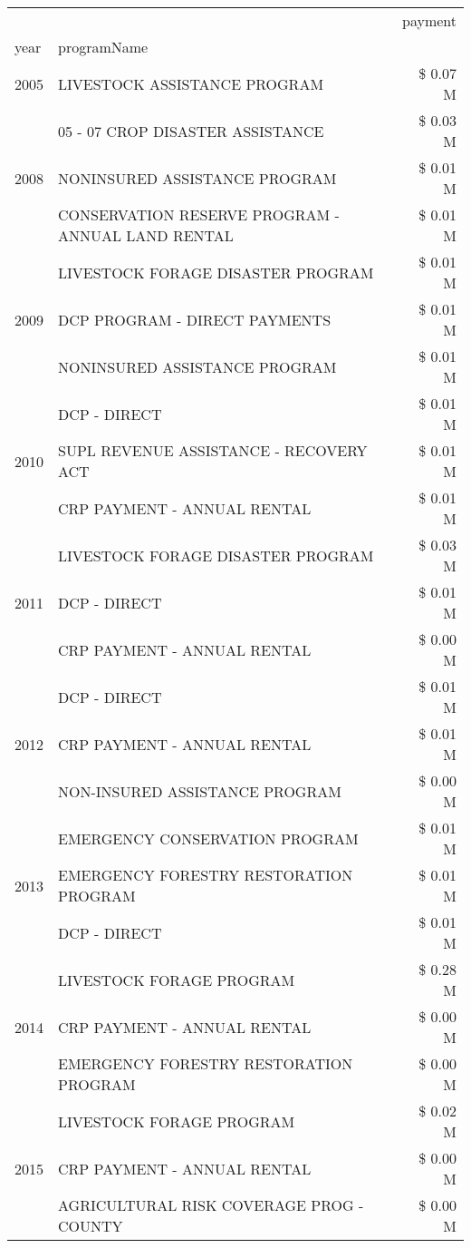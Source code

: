 \begin{tabular}{llr}
\toprule
 &  & payment \\
year & programName &  \\
\midrule
2005 & LIVESTOCK ASSISTANCE PROGRAM & \$ 0.07 M \\
\cline{1-3}
\multirow[t]{3}{*}{2008} & 05 - 07 CROP DISASTER ASSISTANCE & \$ 0.03 M \\
 & NONINSURED ASSISTANCE PROGRAM & \$ 0.01 M \\
 & CONSERVATION RESERVE PROGRAM - ANNUAL LAND RENTAL & \$ 0.01 M \\
\cline{1-3}
\multirow[t]{3}{*}{2009} & LIVESTOCK FORAGE DISASTER  PROGRAM & \$ 0.01 M \\
 & DCP PROGRAM - DIRECT PAYMENTS & \$ 0.01 M \\
 & NONINSURED ASSISTANCE PROGRAM & \$ 0.01 M \\
\cline{1-3}
\multirow[t]{3}{*}{2010} & DCP - DIRECT & \$ 0.01 M \\
 & SUPL REVENUE ASSISTANCE - RECOVERY ACT & \$ 0.01 M \\
 & CRP PAYMENT - ANNUAL RENTAL & \$ 0.01 M \\
\cline{1-3}
\multirow[t]{3}{*}{2011} & LIVESTOCK FORAGE DISASTER PROGRAM & \$ 0.03 M \\
 & DCP - DIRECT & \$ 0.01 M \\
 & CRP PAYMENT - ANNUAL RENTAL & \$ 0.00 M \\
\cline{1-3}
\multirow[t]{3}{*}{2012} & DCP - DIRECT & \$ 0.01 M \\
 & CRP PAYMENT - ANNUAL RENTAL & \$ 0.01 M \\
 & NON-INSURED ASSISTANCE PROGRAM & \$ 0.00 M \\
\cline{1-3}
\multirow[t]{3}{*}{2013} & EMERGENCY CONSERVATION PROGRAM & \$ 0.01 M \\
 & EMERGENCY FORESTRY RESTORATION PROGRAM & \$ 0.01 M \\
 & DCP - DIRECT & \$ 0.01 M \\
\cline{1-3}
\multirow[t]{3}{*}{2014} & LIVESTOCK FORAGE PROGRAM & \$ 0.28 M \\
 & CRP PAYMENT - ANNUAL RENTAL & \$ 0.00 M \\
 & EMERGENCY FORESTRY RESTORATION PROGRAM & \$ 0.00 M \\
\cline{1-3}
\multirow[t]{3}{*}{2015} & LIVESTOCK FORAGE PROGRAM & \$ 0.02 M \\
 & CRP PAYMENT - ANNUAL RENTAL & \$ 0.00 M \\
 & AGRICULTURAL RISK COVERAGE PROG - COUNTY & \$ 0.00 M \\

\end{tabular}
